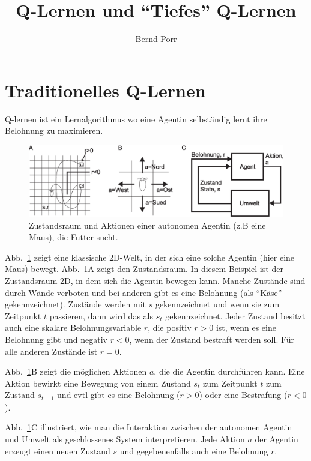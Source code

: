 \documentclass[12pt]{article}
\author{Bernd Porr}
\title{Q-Lernen und ``Tiefes'' Q-Lernen}
\begin{document}
\maketitle
\section{Traditionelles Q-Lernen}

Q-lernen ist ein Lernalgorithmus wo eine Agentin selbständig
lernt ihre Belohnung zu maximieren.

\begin{figure}[!hbt]
\begin{center}
\mbox{\includegraphics[width=\textwidth]{state_action}}
\end{center}
\caption{Zustandsraum und Aktionen einer autonomen Agentin (z.B eine Maus),
  die Futter sucht.
\label{state_action}}
\end{figure}

Abb.~\ref{state_action} zeigt eine klassische 2D-Welt, in der sich
eine solche Agentin (hier eine Maus) bewegt. Abb.~\ref{state_action}A
zeigt den Zustandsraum. In diesem Beispiel ist der Zustandsraum 2D, in
dem sich die Agentin bewegen kann. Manche Zustände sind durch Wände
verboten und bei anderen gibt es eine Belohnung (als ``Käse''
gekennzeichnet). Zustände werden mit $s$ gekennzeichnet und wenn sie
zum Zeitpunkt $t$ passieren, dann wird das als $s_t$
gekennzeichnet. Jeder Zustand besitzt auch eine skalare
Belohnungsvariable $r$, die positiv $r>0$ ist, wenn es eine Belohnung gibt
und negativ $r<0$, wenn der Zustand bestraft werden soll. Für alle anderen
Zustände ist $r=0$.

Abb.~\ref{state_action}B zeigt die möglichen Aktionen $a$, die die
Agentin durchführen kann. Eine Aktion bewirkt eine Bewegung von einem
Zustand $s_t$ zum Zeitpunkt $t$ zum Zustand $s_{t+1}$ und evtl gibt
es eine Belohnung ($r>0$) oder eine Bestrafung ($r<0$).

Abb.~\ref{state_action}C illustriert, wie man die Interaktion zwischen
der autonomen Agentin und Umwelt als geschlossenes System interpretieren. Jede
Aktion $a$ der Agentin erzeugt einen neuen Zustand $s$ und
gegebenenfalls auch eine Belohnung $r$.
\end{document}
